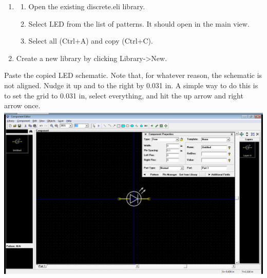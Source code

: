 \documentclass[letterpaper]{article}
\newcounter{saveenum}
\newcommand\liststyleRTFNumxi{%
\renewcommand\theenumi{\arabic{enumi}}
\renewcommand\theenumii{\alph{enumii}}
\renewcommand\theenumiii{\roman{enumiii}}
\renewcommand\theenumiv{\arabic{enumiv}}
\renewcommand\labelenumi{\theenumi.}
\renewcommand\labelenumii{\theenumii.}
\renewcommand\labelenumiii{\theenumiii.}
\renewcommand\labelenumiv{\theenumiv.}
}
\begin{document}
\liststyleRTFNumxi
\setcounter{saveenum}{\value{enumi}}
\begin{enumerate}
\setcounter{enumi}{\value{saveenum}}
\item \setcounter{saveenum}{\value{enumii}}
\begin{enumerate}
\setcounter{enumii}{\value{saveenum}}
\item {\sffamily\color[rgb]{0.30980393,0.5058824,0.7411765}
Open the existing {\textquotedbl}discrete.eli{\textquotedbl} library.}
\item {\sffamily\color[rgb]{0.30980393,0.5058824,0.7411765}
Select {\textquotedbl}LED{\textquotedbl} from the list of patterns. It should open in the main view.}
\item {\sffamily\color[rgb]{0.30980393,0.5058824,0.7411765}
Select all (Ctrl+A) and copy (Ctrl+C).}
\end{enumerate}
\item {\sffamily\color[rgb]{0.30980393,0.5058824,0.7411765}
Create a new library by clicking Library-{\textgreater}New.}
\end{enumerate}
{\sffamily\color[rgb]{0.30980393,0.5058824,0.7411765}
Paste the copied LED schematic. Note that, for whatever reason, the schematic is not aligned. Nudge it up and to the
right by 0.031 in. A simple way to do this is to set the grid to 0.031 in, select everything, and hit the up arrow and
right arrow once.\newline
 \includegraphics[width=5.4in,height=3.3665in]{figures/ee4document-img043.png} }
\end{document}
